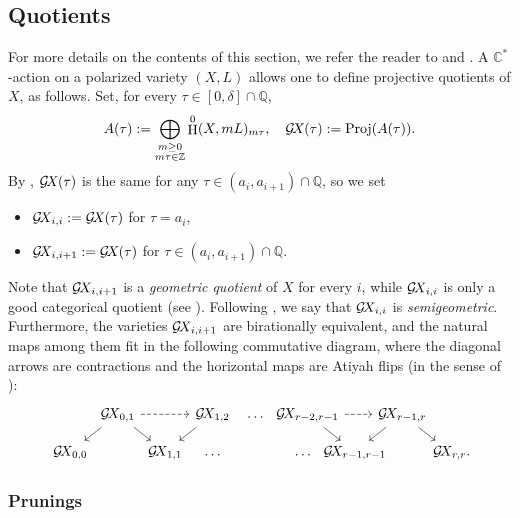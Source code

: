 \documentclass[10pt,a4paper]{article}
\numberwithin{equation}{section}
\theoremstyle{definition}
\theoremstyle{remark}
\DeclareMathOperator{\HH}{H}
\def\C{{\mathbb C}}
\def\Q{{\mathbb Q}}
\def\Z{{\mathbb Z}}
\def\Q{{\mathbb{Q}}}
\def\operatorname#1{\mathop{\rm #1}\nolimits}
\def\Proj{\operatorname{Proj}}
\def\GX{\mathcal{G}\!X\hspace{-0.5pt}}
\newcommand\m{{\mathfrak m}}
\begin{document}
\subsection{Quotients}\label{sssec:quotients} For  more details on the contents of this section,  we refer the reader to \cite{WORS3} and \cite{WORS6}. A $\C^*$-action on a polarized variety $(X,L)$ allows one to define projective quotients of $X$, as follows. Set, for every $\tau \in [0,\delta]\cap \Q$, 
 \[A(\tau):=\bigoplus_{\substack{m\geq 0\\m\tau\in\Z}}\HH^0(X,mL)_{m\tau},\quad \GX(\tau):=\Proj(A(\tau)).
\]
By \cite[Section 2.2]{WORS6}, $\GX(\tau)$ is the same for any  $\tau\in (a_i,a_{i+1})\cap \Q$, so we set 
\begin{itemize}[itemsep=5pt,topsep=5pt]
\item $\GX_{i,i}:=\GX(\tau)$ for $\tau=a_i$,  
\item $\GX_{i,i+1}:=\GX(\tau)$ for $\tau\in(a_i,a_{i+1})\cap \Q$.
\end{itemize}
Note that $\GX_{i,i+1}$ is a {\em geometric quotient} of $X$ for every $i$, while $\GX_{i,i}$ is only a good categorical quotient (see \cite[Section 6.1, Definition, p.~94]{DolgachevGIT}). Following \cite[Chapter 3, p.~10]{BBC}, we say that $\GX_{i,i}$ is {\em semigeometric}.  
Furthermore, the varieties $\GX_{i,i+1}$ are birationally equivalent, and the natural maps among them fit in the following commutative diagram, where the diagonal arrows are contractions and the horizontal maps are Atiyah flips (in the sense of \cite[Definition 6.1]{WORS1}): 
\begin{equation}
\begin{tikzcd}[
  column sep={3.4em,between origins},
  row sep={2.7em,between origins},
]
&\GX_{0,1} \arrow[rr,dashed] \arrow[rd] \arrow[dl]&&\GX_{1,2} \arrow[dl]&\dots\ \ &\GX_{r-2,r-1} \arrow[rr,dashed] \arrow[rd] &&\GX_{r-1,r}\arrow[rd] \arrow[dl]&\\
\GX_{0,0}&&\GX_{1,1}&\dots&&\dots\ \ &\GX_{r-1,r-1}&&\GX_{r,r}\rlap{.}
\end{tikzcd}
\label{eq:GITquot}
\end{equation}

\subsubsection{Prunings} \label{ssec:prun}
\end{document}
